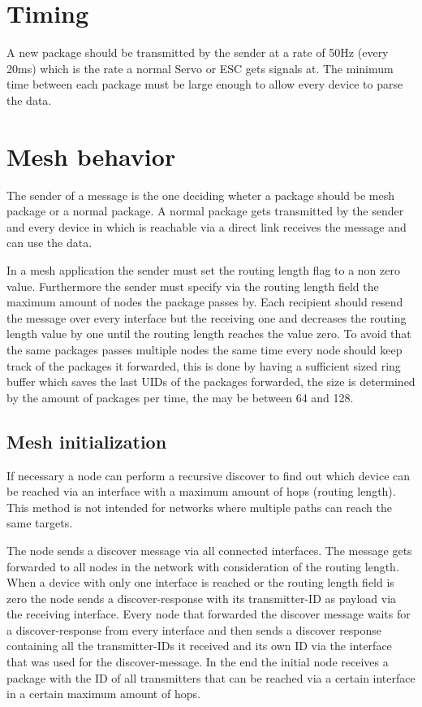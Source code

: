 \documentclass{scrreprt}
\begin{document}
\section{Timing}
A new package should be transmitted by the sender at a rate of 50Hz (every
20ms) which is the rate a normal Servo or ESC gets signals at. The minimum
time between each package must be large enough to allow every device to parse the
data.

\section{Mesh behavior}
The sender of a message is the one deciding wheter a package should be mesh
package or a normal package. A normal package gets transmitted by the sender
and every device in which is reachable via a direct link receives the message and can use the data.


In a mesh application the sender must set the routing length flag to a non zero value.
Furthermore the sender must specify via the routing length field the maximum amount of
nodes the package passes by.
Each recipient should resend the message over every interface but the receiving one and decreases the routing length value by one
until the routing length reaches the value zero. To avoid that the same
packages passes multiple nodes the same time every node
should keep track of the packages it forwarded, this is done by having a
sufficient sized ring buffer which saves the last UIDs of the packages forwarded,
the size is determined by the amount of packages per time,
the may be between 64 and 128.

\subsection{Mesh initialization}
If necessary a node can perform a recursive discover to find out which device can be reached via
an interface with a maximum amount of hops (routing length). This method is not intended for networks where multiple paths can reach the same
targets.

The node sends a discover message via all connected interfaces. The message gets forwarded to all
nodes in the network with consideration of the routing length. When a device with only one interface is reached or the routing length field is zero the node sends a discover-response with its transmitter-ID as payload via the receiving interface. Every node that forwarded the discover message waits for a discover-response from every interface and then sends a discover response containing all the transmitter-IDs it received and its own ID via the interface that was used for the discover-message. In the end the initial node receives a package with the ID of all transmitters that can be reached via a certain interface in a certain maximum amount of hops.
\end{document}

